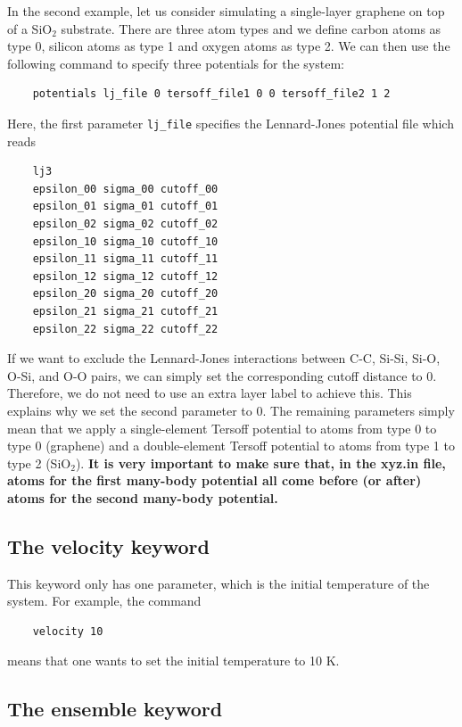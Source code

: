 \documentclass[12pt,a4paper]{report}
\begin{document}
In the second example, let us consider simulating a single-layer graphene on top of a SiO$_2$ substrate. There are three atom types and we define carbon atoms as type 0, silicon atoms as type 1 and oxygen atoms as type 2. We can then use the following command to specify three potentials for the system:
\begin{verbatim}
    potentials lj_file 0 tersoff_file1 0 0 tersoff_file2 1 2
\end{verbatim}
Here,  the first parameter \verb"lj_file" specifies the Lennard-Jones potential file which reads 
\begin{verbatim}
    lj3
    epsilon_00 sigma_00 cutoff_00
    epsilon_01 sigma_01 cutoff_01
    epsilon_02 sigma_02 cutoff_02
    epsilon_10 sigma_10 cutoff_10
    epsilon_11 sigma_11 cutoff_11
    epsilon_12 sigma_12 cutoff_12
    epsilon_20 sigma_20 cutoff_20
    epsilon_21 sigma_21 cutoff_21
    epsilon_22 sigma_22 cutoff_22
\end{verbatim}
If we want to exclude the Lennard-Jones interactions between C-C, Si-Si, Si-O, O-Si, and O-O pairs, we can simply set the corresponding cutoff distance to 0. Therefore, we do not need to use an extra layer label to achieve this. This explains why we set the second parameter to 0. The remaining parameters simply mean that we apply a single-element Tersoff potential to atoms from type 0 to type 0 (graphene) and a double-element Tersoff potential to atoms from type 1 to type 2 (SiO$_2$). \textbf{It is very important to make sure that, in the xyz.in file, atoms for the first many-body potential all come before (or after) atoms for the second many-body potential.}


\subsection{The velocity keyword}

This keyword only has one parameter, which is the initial temperature of the system. For example, the command
\begin{verbatim}
    velocity 10
\end{verbatim}
means that one wants to set the initial temperature to 10 K.

\subsection{The ensemble keyword}
\end{document}
